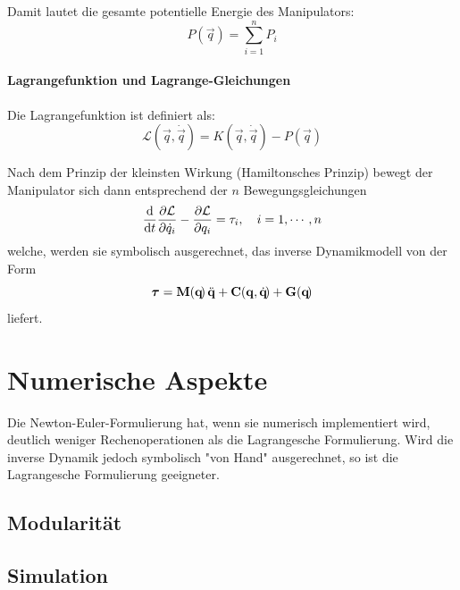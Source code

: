 			Damit lautet die gesamte potentielle Energie des Manipulators:
			\begin{equation*}
				P(\vec{q}\!) = \sum_{i = 1}^{n} P_i
			\end{equation*}
		
		\paragraph{Lagrangefunktion und Lagrange-Gleichungen}
			Die Lagrangefunktion ist definiert als:
			\begin{equation*}
				\mathcal{L}(\vec{q}, \dot{\vec{q}}\!) = K(\vec{q}, \dot{\vec{q}}\!) - P(\vec{q}\!)
			\end{equation*}
			
			Nach dem Prinzip der kleinsten Wirkung (Hamiltonsches Prinzip) bewegt der Manipulator sich dann entsprechend der \(n\) Bewegungsgleichungen
			\begin{equation*}
				\dv{t} \frac{\partial \mathcal{L}}{\partial \dot{q}_i} - \frac{\partial \mathcal{L}}{\partial q_i} = \tau_i,\quad i = 1, \cdots, n
			\end{equation*}
			welche, werden sie symbolisch ausgerechnet, das inverse Dynamikmodell von der Form
			\begin{equation*}
				\boldsymbol{\mathrm{\tau}} = \boldsymbol{\mathrm{M}}(\boldsymbol{\mathrm{q}}\!)\, \ddot{\boldsymbol{\mathrm{q}}} + \boldsymbol{\mathrm{C}}(\boldsymbol{\mathrm{q}}, \dot{\boldsymbol{\mathrm{q}}}\!) + \boldsymbol{\mathrm{G}}(\boldsymbol{\mathrm{q}}\!)
			\end{equation*}
			liefert.

	\section{Numerische Aspekte}
		Die Newton-Euler-Formulierung hat, wenn sie numerisch implementiert wird, deutlich weniger Rechenoperationen als die Lagrangesche Formulierung. Wird die inverse Dynamik jedoch symbolisch "von Hand" ausgerechnet, so ist die Lagrangesche Formulierung geeigneter.

		\subsection{Modularität} %

		\subsection{Simulation} %


